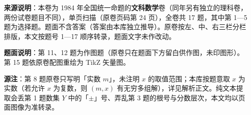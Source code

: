 

\begin{gktip}
\textbf{来源说明}：本卷为 1984 年全国统一命题的\textbf{文科数学}卷（同年另有独立的理科卷，两份试卷题目不同），单页扫描（原卷页码第 24 页），全卷共 17 题，其中第 1—5 题为选择题。题面不含答案（答案由本库独立推导）。原卷按左、中、右三栏分栏排版，本文按题号 1—17 顺序转录，题面文字未作改动。

\textbf{题面说明}：第 11、12 题为作图题（原卷只在题面下方留白供作图，未印图形）。第 15 题依原卷配图重绘为 TikZ 矢量图。

\textbf{源注}：第 8 题原卷只写明「实数 $m$」，未注明 $x$ 的取值范围；本库按题意取 $x$ 为实数（若允许 $x$ 为复数，则 $(m,x)$ 有无穷多组解），详见解析正文。纯文本提取会丢第 1 题数集 $Y$ 中的「$\pm$」号、弄乱第 3 题的根号与分数层次，本文均以页面图像为准转录。
\end{gktip}

